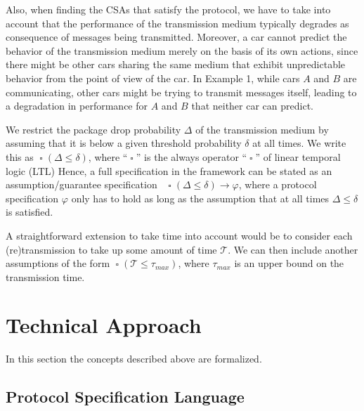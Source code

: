 \documentclass{sig-alternate}
\DeclareMathOperator{\always}{\mathop\square}
\renewcommand{\v}{\varphi}
\renewcommand{\d}{\delta}
\newcommand{\dropprob}{\Delta}
\begin{document}
Also, when finding the CSAs that satisfy the protocol, we have to take into account that the performance of the transmission medium typically degrades as consequence of messages being transmitted. Moreover, a car cannot predict the behavior of the transmission medium merely on the basis of its own actions, since there might be other cars sharing the same medium that exhibit unpredictable behavior from the point of view of the car. In Example 1, while cars $A$ and $B$ are communicating, other cars might be trying to transmit messages itself, leading to a degradation in performance for $A$ and $B$ that neither car can predict.

We restrict the package drop probability $\dropprob$ of the transmission medium by assuming that it is below a given threshold probability $\d$ at all times. We write this as $\always(\dropprob \leq \d)$, where ``$\always$'' is the always operator ``$\always$'' of linear temporal logic (LTL) Hence, a full specification in the framework can be stated as an assumption/guarantee specification~\cite{AGspec} $\always(\dropprob \leq \d) \rightarrow \v$, where a protocol specification $\v$ only has to hold as long as the assumption that at all times $\dropprob \leq \d$ is satisfied.

A straightforward extension to take time into account would be to consider each (re)transmission to take up some amount of time $\mathcal{T}$. We can then include another assumptions of the form $\always(\mathcal{T} \leq \tau_{max})$, where $\tau_{max}$ is an upper bound on the transmission time.





\vspace{-.06in}




\section{Technical Approach} \label{sec:approach}

In this section the concepts described above are formalized.


\subsection{Protocol Specification Language} \label{sec:speclang}
\end{document}
